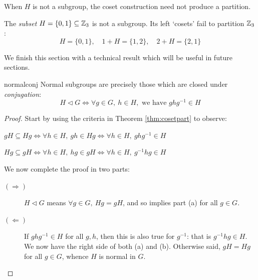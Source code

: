 When $H$ is not a subgroup, the coset construction need not produce a partition.

\begin{example}{}{}
	The \emph{subset} $H=\{0,1\}\subseteq\mathbb{Z}_3$ is not a subgroup. Its left `cosets' fail to partition $\mathbb{Z}_3$:
	\[
		H=\{0,1\},\quad 1+H=\{1,2\},\quad 2+H=\{2,1\}
	\]
\end{example}

We finish this section with a technical result which will be useful in future sections.

\begin{cor}{}{normalconj}
	Normal subgroups are precisely those which are closed under \emph{conjugation}:
  \[
  	H\triangleleft G\iff \forall g\in G,\ h\in H,\text{ we have }gh g^{-1}\in H
  \]
\end{cor}

\begin{proof}
	Start by using the criteria in Theorem \ref{thm:cosetpart} to observe:
	\begin{enumeratea}
	  \item $gH\subseteq Hg\iff \forall h\in H,\ gh\in Hg \iff \forall h\in H,\ gh g^{-1}\in H$
	  \item $Hg\subseteq gH\iff \forall h\in H,\ hg\in gH \iff \forall h\in H,\ g^{-1}hg\in H$
	\end{enumeratea}
	We now complete the proof in two parts:
	\begin{description}
		\item[\normalfont $(\Rightarrow)$] $H\triangleleft G$ means $\forall g\in G,\ Hg=gH$, and so implies part (a) for all $g\in G$. 
		\item[\normalfont $(\Leftarrow)$] If $gh g^{-1}\in H$ for all $g,h$, then this is also true for $g^{-1}$: that is $g^{-1}hg\in H$. We now have the right side of both (a) and (b). Otherwise said, $gH=Hg$ for all $g\in G$, whence $H$ is normal in $G$.\qedhere
	\end{description}
\end{proof}



